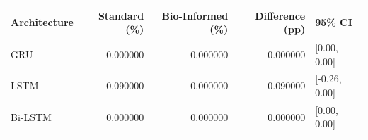 \begin{tabular}{lrrrl}
\toprule
Architecture & Standard (\%) & Bio-Informed (\%) & Difference (pp) & 95\% CI \\
\midrule
GRU & 0.000000 & 0.000000 & 0.000000 & [0.00, 0.00] \\
LSTM & 0.090000 & 0.000000 & -0.090000 & [-0.26, 0.00] \\
Bi-LSTM & 0.000000 & 0.000000 & 0.000000 & [0.00, 0.00] \\
\bottomrule
\end{tabular}
